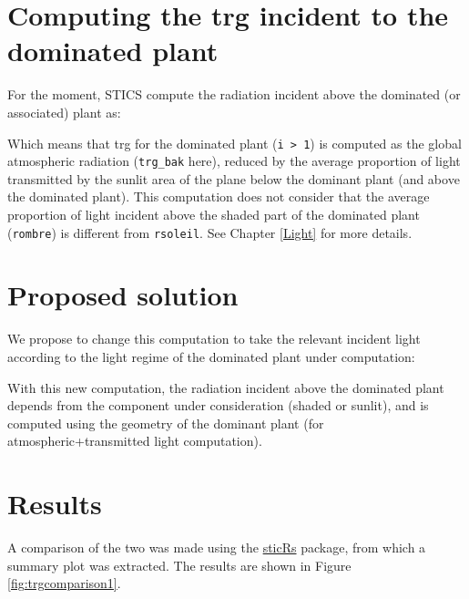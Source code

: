 \documentclass[
]{book}
\begin{document}
\hypertarget{computing-the-trg-incident-to-the-dominated-plant}{%
\section{Computing the trg incident to the dominated plant}\label{computing-the-trg-incident-to-the-dominated-plant}}

For the moment, STICS compute the radiation incident above the dominated (or associated) plant as:

Which means that trg for the dominated plant (\texttt{i\ \textgreater{}\ 1}) is computed as the global atmospheric radiation (\texttt{trg\_bak} here), reduced by the average proportion of light transmitted by the sunlit area of the plane below the dominant plant (and above the dominated plant).
This computation does not consider that the average proportion of light incident above the shaded part of the dominated plant (\texttt{rombre}) is different from \texttt{rsoleil}. See Chapter \ref{Light} for more details.

\hypertarget{proposed-solution}{%
\section{Proposed solution}\label{proposed-solution}}

We propose to change this computation to take the relevant incident light according to the light regime of the dominated plant under computation:

With this new computation, the radiation incident above the dominated plant depends from the component under consideration (shaded or sunlit), and is computed using the geometry of the dominant plant (for atmospheric+transmitted light computation).

\hypertarget{results}{%
\section{Results}\label{results}}

A comparison of the two was made using the \href{https://github.com/VEZY/sticRs}{sticRs} package, from which a summary plot was extracted. The results are shown in Figure \ref{fig:trgcomparison1}.
\end{document}
